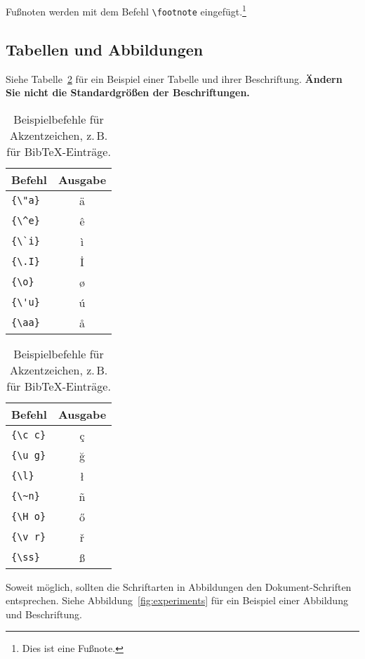 \documentclass[11pt]{article}
\begin{document}
Fußnoten werden mit dem Befehl \verb|\footnote| eingefügt.\footnote{Dies ist eine Fußnote.}

\subsection{Tabellen und Abbildungen}

Siehe Tabelle~\ref{tab:accents} für ein Beispiel einer Tabelle und ihrer Beschriftung.
\textbf{Ändern Sie nicht die Standardgrößen der Beschriftungen.}

\begin{table}
  \centering
  \begin{tabular}{lc}
    \hline
    \textbf{Befehl} & \textbf{Ausgabe} \\
    \hline
    \verb|{\"a}|     & {\"a}           \\
    \verb|{\^e}|     & {\^e}           \\
    \verb|{\`i}|     & {\`i}           \\
    \verb|{\.I}|     & {\.I}           \\
    \verb|{\o}|      & {\o}            \\
    \verb|{\'u}|     & {\'u}           \\
    \verb|{\aa}|     & {\aa}           \\\hline
  \end{tabular}
  \begin{tabular}{lc}
    \hline
    \textbf{Befehl} & \textbf{Ausgabe} \\
    \hline
    \verb|{\c c}|    & {\c c}          \\
    \verb|{\u g}|    & {\u g}          \\
    \verb|{\l}|      & {\l}            \\
    \verb|{\~n}|     & {\~n}           \\
    \verb|{\H o}|    & {\H o}          \\
    \verb|{\v r}|    & {\v r}          \\
    \verb|{\ss}|     & {\ss}           \\
    \hline
  \end{tabular}
  \caption{Beispielbefehle für Akzentzeichen, z.\,B. für Bib\TeX{}-Einträge.}
  \label{tab:accents}
\end{table}

Soweit möglich, sollten die Schriftarten in Abbildungen den Dokument-Schriften entsprechen. Siehe Abbildung~\ref{fig:experiments} für ein Beispiel einer Abbildung und Beschriftung.
\end{document}
